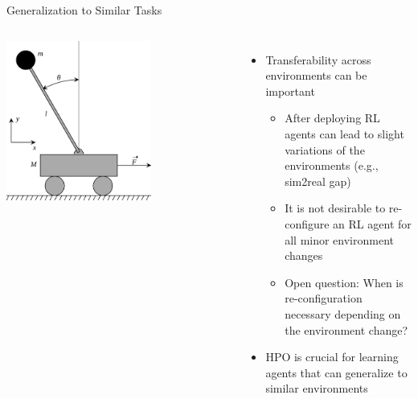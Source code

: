 \documentclass[aspectratio=169]{../latex_main/tntbeamer}  %
\begin{document}
\begin{frame}[c]{Generalization to Similar Tasks}

\begin{columns}


\centering
\includegraphics[width=0.65\textwidth]{images/cart-pole.png}


\begin{itemize}
    \item Transferability across environments can be important~ 
    \begin{itemize}
        \item After deploying RL agents can lead to slight variations of the environments (e.g., sim2real gap)
        \item It is not desirable to re-configure an RL agent for all minor environment changes
        \item Open question: When is re-configuration necessary depending on the environment change?
    \end{itemize}
    \item HPO is crucial for learning agents that can generalize to similar environments~
\end{itemize}

\end{columns}

\end{frame}
\end{document}
